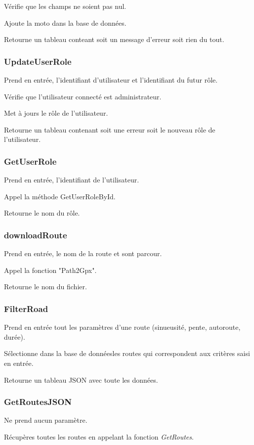 \documentclass[a4paper]{article}
\newcommand{\bdd}{base de données}
\begin{document}
Vérifie que les champs ne soient pas nul.

Ajoute la moto dans la \bdd.

Retourne un tableau conteant soit un message d'erreur soit rien du tout.

\subsubsection{UpdateUserRole}
Prend en entrée, l'identifiant d'utilisateur et l'identifiant du futur rôle.

Vérifie que l'utilisateur connecté est administrateur.

Met à jours le rôle de l'utilisateur.

Retourne un tableau contenant soit une erreur soit le nouveau rôle de l'utilisateur.

\subsubsection{GetUserRole}
Prend en entrée, l'identifiant de l'utilisateur.

Appel la méthode GetUserRoleById.

Retourne le nom du rôle.

\subsubsection{downloadRoute}
Prend en entrée, le nom de la route et sont parcour.

Appel la fonction "Path2Gpx".

Retourne le nom du fichier.

\subsubsection{FilterRoad}
Prend en entrée tout les paramètres d'une route (sinueusité, pente, autoroute, durée).

Sélectionne dans la \bdd les routes qui correspondent aux critères saisi en entrée.

Retourne un tableau JSON avec toute les données.


\subsubsection{GetRoutesJSON}
Ne prend aucun paramètre.

Récupères toutes les routes en appelant la fonction \emph{GetRoutes}.
\end{document}
